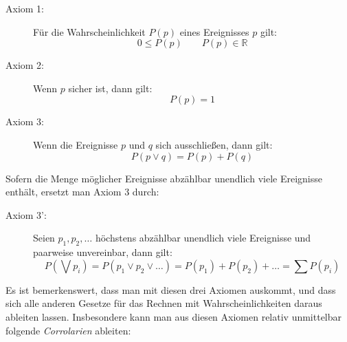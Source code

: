 \begin{description}
\item[Axiom 1:] Für die Wahrscheinlichkeit $P(p)$ eines Ereignisses $p$ gilt:
\[0 \leq P(p) \qquad P(p) \in \mathbb{R}\]
\item[Axiom 2:] Wenn $p$ sicher ist, dann gilt:
\[P(p) = 1\]
\item[Axiom 3:] Wenn die Ereignisse $p$ und $q$ sich ausschließen, dann gilt:
\[P(p \vee q) = P(p) + P(q)\]
\end{description}

Sofern die Menge möglicher Ereignisse abzählbar unendlich viele Ereignisse
enthält, ersetzt man Axiom 3 durch:

\begin{description}
\item[Axiom 3':] Seien $p_1, p_2, \ldots$ höchstens abzählbar
unendlich viele Ereignisse und paarweise unvereinbar, dann gilt:
\[P(\bigvee p_i) = P(p_1 \vee p_2 \vee \ldots) = P(p_1) + P(p_2) + 
\ldots = \sum P(p_i)\]   
\end{description} 

Es ist bemerkenswert, dass man mit diesen drei Axiomen auskommt, und dass sich
alle anderen Gesetze für das Rechnen mit Wahrscheinlichkeiten daraus ableiten
lassen. Insbesondere kann man aus diesen Axiomen relativ unmittelbar folgende
{\em Corrolarien} ableiten:

